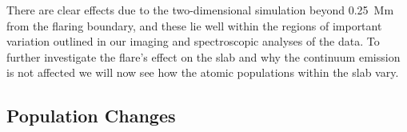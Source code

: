 There are clear effects due to the two-dimensional simulation beyond \SI{0.25}{\mega\metre} from the flaring boundary, and these lie well within the regions of important variation outlined in our imaging and spectroscopic analyses of the data.
To further investigate the flare's effect on the slab and why the continuum emission is not affected we will now see how the atomic populations within the slab vary.

\subsection{Population Changes}

